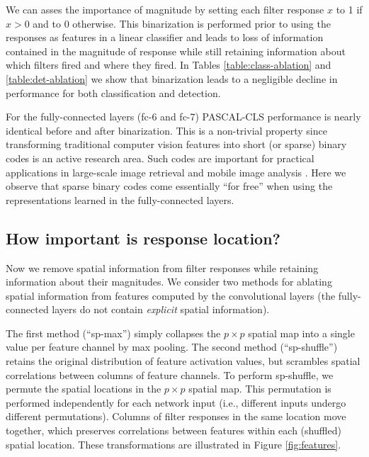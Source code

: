 We can asses the importance of magnitude by setting each filter response $x$ to 1 if $x > 0$ and to $0$ otherwise. This binarization is performed prior to using the responses as features in a linear classifier and leads to loss of information contained in the magnitude of response while still retaining information about which filters fired and where they fired. 
In Tables \ref{table:class-ablation} and \ref{table:det-ablation} we show that binarization leads to a negligible decline in performance for both classification and detection. 

For the fully-connected layers (fc-6 and fc-7) PASCAL-CLS performance is nearly identical before and after binarization.
This is a non-trivial property since transforming traditional computer vision features into short (or sparse) binary codes is an active research area. Such codes are important for practical applications in large-scale image retrieval and mobile image analysis \cite{gong2011iterative,weiss2009spectral}. Here we observe that sparse binary codes come essentially ``for free'' when using the representations learned in the fully-connected layers.

\subsection{How important is response location?}
\label{sub:imp-loc}
Now we remove spatial information from filter responses while retaining information about their magnitudes. We consider two methods for ablating spatial information from features computed by the convolutional layers (the fully-connected layers do not contain \emph{explicit} spatial information).

The first method (``sp-max'') simply collapses the $p \times p$ spatial map into a single value per feature channel by max pooling. The second method (``sp-shuffle'') retains the original distribution of feature activation values, but scrambles spatial correlations between columns of feature channels. To perform sp-shuffle, we permute the spatial locations in the $p \times p$ spatial map. This permutation is performed independently for each network input (i.e., different inputs undergo different permutations). Columns of filter responses in the same location move together, which preserves correlations between features within each (shuffled) spatial location. These transformations are illustrated in Figure \ref{fig:features}.

